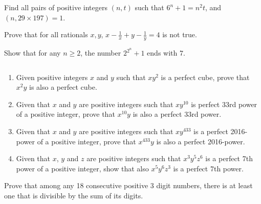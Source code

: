 \documentclass[problems.tex]{subfile}
\begin{document}
	\begin{problem}
		Find all pairs of positive integers $(n,t)$ such that $6^n+1=n^2t$, and $(n,29 \times 197)=1$. %
	\end{problem}

	\begin{problem}
		Prove that for all rationals $x,y$, $x-\frac{1}{x}+y-\frac{1}{y}=4$ is not true. %
	\end{problem}

	\begin{problem}
		Show that for any $n\geq 2$, the number $2^{2^n}+1$ ends with $7$. %
	\end{problem}

	\begin{problem}
		$ $
		\begin{enumerate}
			\item Given positive integers $x$ and $y$ such that $xy^2$ is a perfect cube, prove that $x^2y$ is also a perfect cube. %
			\item Given that $x$ and $y$ are positive integers such that $xy^{10}$ is perfect 33rd power of a positive integer, prove that $x^{10}y$ is also a perfect 33rd power. %
			\item Given that $x$ and $y$ are positive integers such that $xy^{433}$ is a perfect 2016-power of a positive integer, prove that $x^{433}y$ is also a perfect 2016-power. %
			\item Given that $x$, $y$ and $z$ are positive integers such that $x^3y^5z^6$ is a perfect 7th power of a positive integer, show that also $x^5y^6z^3$ is a perfect 7th power. %
		\end{enumerate}
	\end{problem}

	\begin{problem}
		Prove that among any 18 consecutive positive $3$ digit numbers, there is at least one that is divisible by the sum of its digits. %
	\end{problem}
\end{document}
